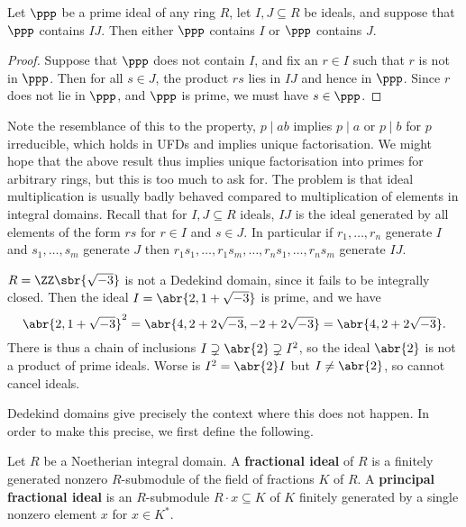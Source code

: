 \begin{lemma}
\label{lem:11.1.3}
Let $ \ppp $ be a prime ideal of any ring $ R $, let $ I, J \subseteq R $ be ideals, and suppose that $ \ppp $ contains $ IJ $. Then either $ \ppp $ contains $ I $ or $ \ppp $ contains $ J $.
\end{lemma}

\begin{proof}
Suppose that $ \ppp $ does not contain $ I $, and fix an $ r \in I $ such that $ r $ is not in $ \ppp $. Then for all $ s \in J $, the product $ rs $ lies in $ IJ $ and hence in $ \ppp $. Since $ r $ does not lie in $ \ppp $, and $ \ppp $ is prime, we must have $ s \in \ppp $.
\end{proof}

Note the resemblance of this to the property, $ p \mid ab $ implies $ p \mid a $ or $ p \mid b $ for $ p $ irreducible, which holds in UFDs and implies unique factorisation. We might hope that the above result thus implies unique factorisation into primes for arbitrary rings, but this is too much to ask for. The problem is that ideal multiplication is usually badly behaved compared to multiplication of elements in integral domains. Recall that for $ I, J \subseteq R $ ideals, $ IJ $ is the ideal generated by all elements of the form $ rs $ for $ r \in I $ and $ s \in J $. In particular if $ r_1, \dots, r_n $ generate $ I $ and $ s_1, \dots, s_m $ generate $ J $ then $ r_1s_1, \dots, r_1s_m, \dots, r_ns_1, \dots, r_ns_m $ generate $ IJ $.

\pagebreak

\begin{example*}
$ R = \ZZ\sbr{\sqrt{-3}} $ is not a Dedekind domain, since it fails to be integrally closed. Then the ideal $ I = \abr{2, 1 + \sqrt{-3}} $ is prime, and we have
$$ \abr{2, 1 + \sqrt{-3}}^2 = \abr{4, 2 + 2\sqrt{-3}, -2 + 2\sqrt{-3}} = \abr{4, 2 + 2\sqrt{-3}}. $$
There is thus a chain of inclusions $ I \supsetneq \abr{2} \supsetneq I^2 $, so the ideal $ \abr{2} $ is not a product of prime ideals. Worse is $ I^2 = \abr{2}I $ but $ I \ne \abr{2} $, so cannot cancel ideals.
\end{example*}

Dedekind domains give precisely the context where this does not happen. In order to make this precise, we first define the following.

\begin{definition}
Let $ R $ be a Noetherian integral domain. A \textbf{fractional ideal} of $ R $ is a finitely generated nonzero $ R $-submodule of the field of fractions $ K $ of $ R $. A \textbf{principal fractional ideal} is an $ R $-submodule $ R \cdot x \subseteq K $ of $ K $ finitely generated by a single nonzero element $ x $ for $ x \in K^* $.
\end{definition}

